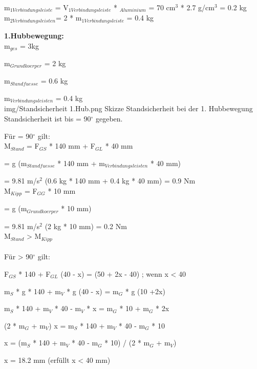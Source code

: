 m$_{1 Verbindungsleiste}$ = V$_{1 Verbindungsleiste}$ * \rho$_{Aluminium}$ = 70 cm$^{3}$ * 2.7 g/cm$^{3}$ = 0.2 kg\\

m$_{2 Verbindungsleisten}$= 2 * m$_{1 Verbindungsleiste}$ = 0.4 kg

\newpage

\textbf{1.Hubbewegung:}\\

m$_{ges}$ = 3kg

m$_{Grundkoerper}$ = 2 kg

m$_{Standfuesse}$ = 0.6 kg

m$_{Verbindungsleisten}$ = 0.4 kg\\

\image
 {img/Standsicherheit 1.Hub.png}
 {Skizze Standsicherheit bei der 1. Hubbewegung}\\

Standsicherheit ist bis {\alpha} = 90$^\circ$ gegeben.

Für {\alpha} = 90$^\circ$ gilt:\\

M$_{Stand}$ = F$_{GS}$ * 140 mm + F$_{GL}$ * 40 mm

            = g (m$_{Standfuesse}$ * 140 mm + m$_{Verbindungsleisten}$ * 40 mm)
            
            = 9.81 m/s$^{2}$ (0.6 kg * 140 mm + 0.4 kg * 40 mm) = 0.9 Nm\\

M$_{Kipp}$  = F$_{GG}$ * 10 mm

            = g (m$_{Grundkoerper}$ * 10 mm)
            
            = 9.81 m/s$^{2}$ (2 kg * 10 mm) = 0.2 Nm\\
            
M$_{Stand}$ > M$_{Kipp}$\\
\\

Für {\alpha} > 90$^\circ$ gilt:\\

\begin{center}

F$_{GS}$ * 140 + F$_{GL}$ (40 - x) = (50 + 2x - 40) ; wenn x < 40

m$_{S}$ * g * 140 + m$_{V}$ * g (40 - x) = m$_{G}$ * g (10 +2x)

m$_{S}$ * 140 + m$_{V}$ * 40 - m$_{V}$ * x = m$_{G}$ * 10 + m$_{G}$ * 2x

(2 * m$_{G}$ + m$_{V}$) x = m$_{S}$ * 140 + m$_{V}$ * 40 - m$_{G}$ * 10

x = (m$_{S}$ * 140 + m$_{V}$ * 40 - m$_{G}$ * 10) / (2 * m$_{G}$ + m$_{V}$)

x = 18.2 mm (erfüllt x < 40 mm)

\end{center}

